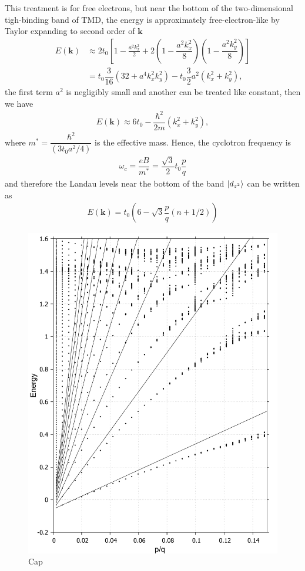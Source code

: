 \documentclass{report}
\newcommand{\f}[2]{\dfrac{#1}{#2}}
\begin{document}
This treatment is for free electrons, but near the bottom of the two-dimensional tigh-binding band of TMD, the energy is approximately free-electron-like by Taylor expanding to second order of $\mathbf{k}$ \cite{10.1119/1.1615568}
\begin{equation}
	\begin{aligned}
		E(\mathbf{k}) 
		&\approx 2 t_{0} \left[1 - \frac{a^{2} k_{x}^{2}}{2} + 2\left(1 - \f{a^{2} k_{x}^{2}}{8}\right)\left(1 - \f{a^{2} k_{y}^{2}}{8}\right)\right] \\
		&= t_{0} \f{3}{16} \left(32 + a^{4} k_{x}^{2} k_{y}^{2}\right) - t_{0} \f{3}{2} a^{2}(k_{x}^{2} + k_{y}^{2}) ,
	\end{aligned}
\end{equation}	
the first term $a^{2}$ is negligibly small and another can be treated like constant, then we have
\begin{gather}
	E(\mathbf{k}) 
	\approx 6 t_{0} - \f{\hbar^{2}}{2m} (k_{x}^{2} + k_{y}^{2}),
\end{gather}
where $m^{*} = \f{\hbar^{2}}{(3t_{0}a^{2} / 4) }$ is the effective mass. Hence, the cyclotron frequency is 
\begin{gather}
	\omega_{c} = \f{eB}{m^{*}} = \f{\sqrt{3}}{2} t_{0} \f{p}{q}
\end{gather}	
and therefore the Landau levels near the bottom of the band $\ket{d_{z^{2}}}$ can be written as 
\begin{gather}
	E(\mathbf{k}) = t_{0} \left(6 - \sqrt{3} \f{p}{q}( n + 1 /2)\right)
\end{gather}	
\begin{figure}[htb]
	\centering
	\includegraphics[width=0.5\linewidth,height=0.5\linewidth]{pic/landaulevel_h0_q_452.pdf}
	\caption{\label{fig:landau level 1} Cap}
\end{figure}
\end{document}
